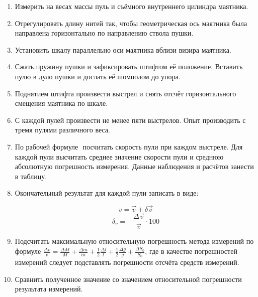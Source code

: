 \begin{enumerate}
    \item Измерить на весах массы пуль и съёмного внутреннего цилиндра маятника.

    \item Отрегулировать длину нитей так, чтобы геометрическая ось маятника была направлена горизонтально по направлению ствола пушки.

    \item Установить шкалу параллельно оси маятника вблизи визира маятника.
    
    \item Сжать пружину пушки и зафиксировать штифтом её положение. Вставить пулю в дуло пушки и дослать её шомполом до упора.
    
    \item Поднятием штифта произвести выстрел и снять отсчёт горизонтального смещения маятника по шкале.
    
    \item С каждой пулей произвести не менее пяти выстрелов. Опыт производить с тремя пулями различного веса.
    
    \item По рабочей формуле $  $ посчитать скорость пули при каждом выстреле. %
    Для каждой пули высчитать среднее значение скорости пули и среднюю абсолютную погрешность измерения.
    Данные наблюдения и расчётов занести в таблицу.
    
    \item Окончательный результат для каждой пули записать в виде:
    
    \begin{equation} 
            v=\vec{v}\pm\delta\vec{v}
    \end{equation}
    \begin{equation} 
            \delta_v=\pm\frac{\Delta\vec{v}}{\vec{v}}\cdot 100 %
    \end{equation}

    \item Подсчитать максимальную относительную погрешность метода измерений по формуле
    $\frac{\Delta v}{v}=\frac{\Delta M}{M}+\frac{\Delta m}{m}+\frac{1}{2}\frac{\Delta l}{l}+\frac{1}{2}\frac{\Delta g}{g}+\frac{\Delta S_0}{S_0}$,
    где в качестве погрешностей измерений следует подставлять погрешности отсчёта средств измерений.

    \item Сравнить полученное значение со значением относительной погрешности результата измерений.
\end{enumerate}